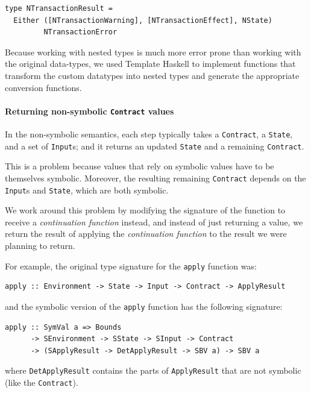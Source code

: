 \documentclass[runningheads]{llncs}
\begin{document}
\begin{verbatim}
type NTransactionResult =
  Either ([NTransactionWarning], [NTransactionEffect], NState)
         NTransactionError
\end{verbatim}

\noindent
Because working with nested types is much more error prone than working with the original data-types, we used Template Haskell \cite{sheard2002template} to implement functions that transform the custom datatypes into nested types and generate the appropriate conversion functions.

\paragraph{Returning non-symbolic \texttt{Contract} values}

In the non-symbolic semantics, each step typically takes a \texttt{Contract}, a \texttt{State}, and a set of \texttt{Input}s; and it returns an updated \texttt{State} and a remaining \texttt{Contract}.

This is a problem because values that rely on symbolic values have to be themselves symbolic. Moreover,  the resulting remaining \texttt{Contract} depends on the \texttt{Input}s and \texttt{State}, which are both symbolic.

We work around this problem by  modifying the signature of the function to receive a \textit{continuation function} instead, and instead of just returning a value, we return the result of applying the \textit{continuation function} to the result we were planning to return.

For example, the original type signature for the \texttt{apply} function was:

\begin{verbatim}
apply :: Environment -> State -> Input -> Contract -> ApplyResult
\end{verbatim}

\noindent
and the symbolic version of the \texttt{apply} function has the following signature:

\begin{verbatim}
apply :: SymVal a => Bounds
      -> SEnvironment -> SState -> SInput -> Contract
      -> (SApplyResult -> DetApplyResult -> SBV a) -> SBV a
\end{verbatim}

\noindent
where \texttt{DetApplyResult} contains the parts of \texttt{ApplyResult} that are not symbolic (like the \texttt{Contract}).
\end{document}
